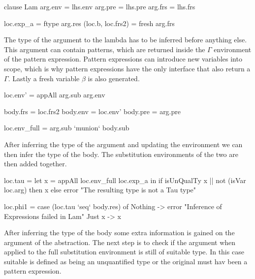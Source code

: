 \begin{code}
clause Lam
    arg.env    = lhs.env
    arg.pre    = lhs.pre
    arg.frs    = lhs.frs
   
    loc.exp_a  = ftype arg.res
    (loc.b, loc.frs2) = fresh arg.frs
\end{code}
The type of the argument to the lambda has to be inferred before anything else. This argument can contain patterns, which are returned inside the $\Gamma$ environment of the pattern expression. Pattern expressions can introduce new variables into scope, which is why pattern expressions have the only interface that also return a $\Gamma$. Lastly a fresh variable $\beta$ is also generated.
       
\begin{code}
loc.env'  = appAll arg.sub arg.env
          
body.frs  = loc.frs2
body.env  = loc.env'
body.pre  = arg.pre
    
loc.env_full = arg.sub `munion` body.sub
\end{code}
After inferring the type of the argument and updating the environment we can then infer the type of the body. The substitution environments of the two are then added together.     

\begin{code}
loc.tau =  let x = appAll loc.env_full loc.exp_a
           in if  isUnQualTy x || not (isVar loc.arg)
                  then x
                  else error "The resulting type is not a Tau type"
                     
loc.phi1 = case (loc.tau `seq` body.res) of
             Nothing  -> error "Inference of Expressions failed in Lam"
             Just x   -> x
\end{code}
After inferring the type of the body some extra information is gained on the argument of the abstraction. The next step is to check if the argument when applied to the full substitution environment is still of suitable type. In this case suitable is defined as being an unquantified type or the original must hav been a pattern expression.

